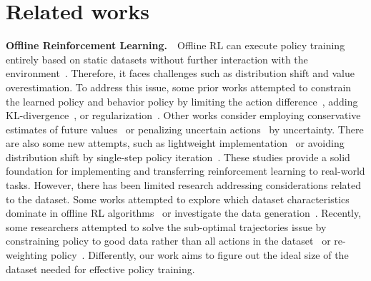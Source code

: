 \clearpage
\section{Related works}
\label{appx:related_work}

\textbf{Offline Reinforcement Learning.}\ \
Offline RL can execute policy training entirely based on static datasets without further interaction with the environment~\cite{levine2020offline}.
Therefore, it faces challenges such as distribution shift and value overestimation.
To address this issue, some prior works attempted to constrain the learned policy and behavior policy by limiting the action difference~\cite{fujimoto2019off}, adding KL-divergence~\cite{nair2020awac,peng2019advantage,wu2019behavior}, or regularization~\cite{kumar2019stabilizing}.
Other works consider employing conservative estimates of future values~\cite{kumar2020conservative,ma2021conservative} or penalizing uncertain actions~\cite{janner2019trust,yu2021combo,kidambi2020morel} by uncertainty.
There are also some new attempts, such as lightweight implementation~\cite{fujimoto2021minimalist} or avoiding distribution shift by single-step policy iteration~\cite{kostrikov2021offline}.
These studies provide a solid foundation for implementing and transferring reinforcement learning to real-world tasks.
However, there has been limited research addressing considerations related to the dataset.
Some works attempted to explore which dataset characteristics dominate in offline RL algorithms~\cite{schweighofer2021understanding, swazinna2021measuring} or investigate the data generation~\cite{yarats2022don}.
Recently, some researchers attempted to solve the sub-optimal trajectories issue by constraining policy to good data rather than all actions in the dataset~\cite{hong2023beyond} or re-weighting policy~\cite{hong2023harnessing}.
Differently, our work aims to figure out the ideal size of the dataset needed for effective policy training.

